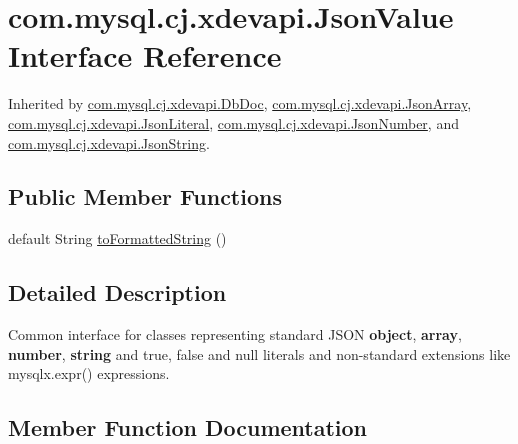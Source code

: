\hypertarget{interfacecom_1_1mysql_1_1cj_1_1xdevapi_1_1_json_value}{}\section{com.\+mysql.\+cj.\+xdevapi.\+Json\+Value Interface Reference}
\label{interfacecom_1_1mysql_1_1cj_1_1xdevapi_1_1_json_value}


Inherited by \mbox{\hyperlink{interfacecom_1_1mysql_1_1cj_1_1xdevapi_1_1_db_doc}{com.\+mysql.\+cj.\+xdevapi.\+Db\+Doc}}, \mbox{\hyperlink{classcom_1_1mysql_1_1cj_1_1xdevapi_1_1_json_array}{com.\+mysql.\+cj.\+xdevapi.\+Json\+Array}}, \mbox{\hyperlink{enumcom_1_1mysql_1_1cj_1_1xdevapi_1_1_json_literal}{com.\+mysql.\+cj.\+xdevapi.\+Json\+Literal}}, \mbox{\hyperlink{classcom_1_1mysql_1_1cj_1_1xdevapi_1_1_json_number}{com.\+mysql.\+cj.\+xdevapi.\+Json\+Number}}, and \mbox{\hyperlink{classcom_1_1mysql_1_1cj_1_1xdevapi_1_1_json_string}{com.\+mysql.\+cj.\+xdevapi.\+Json\+String}}.

\subsection*{Public Member Functions}
\begin{DoxyCompactItemize}
\item 
default String \mbox{\hyperlink{interfacecom_1_1mysql_1_1cj_1_1xdevapi_1_1_json_value_aed42bf9ff63b3cd329cb1fabcf9dfe41}{to\+Formatted\+String}} ()
\end{DoxyCompactItemize}


\subsection{Detailed Description}
Common interface for classes representing standard J\+S\+ON {\bfseries object}, {\bfseries array}, {\bfseries number}, {\bfseries string} and \textquotesingle{}true\textquotesingle{}, \textquotesingle{}false\textquotesingle{} and \textquotesingle{}null\textquotesingle{} literals and non-\/standard extensions like mysqlx.\+expr() expressions. 

\subsection{Member Function Documentation}
\mbox{\label{interfacecom_1_1mysql_1_1cj_1_1xdevapi_1_1_json_value_aed42bf9ff63b3cd329cb1fabcf9dfe41}} 
